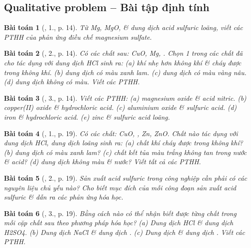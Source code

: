 \documentclass{article}
\newtheorem{baitoan}{Bài toán}
\begin{document}
\subsection{Qualitative problem -- Bài tập định tính}

\begin{baitoan}[\cite{SGK_Hoa_Hoc_9}, 1., p. 14]
	Từ \emph{Mg, MgO, } \& dung dịch acid sulfuric loãng, viết các PTHH của phản ứng điều chế magnesium sulfate.
\end{baitoan}

\begin{baitoan}[\cite{SGK_Hoa_Hoc_9}, 2., p. 14]
	Có các chất sau: \emph{CuO, Mg, }. Chọn 1 trong các chất đã cho tác dụng với dung dịch \emph{HCl} sinh ra: (a) khí nhẹ hơn không khí \& cháy được trong không khí. (b) dung dịch có màu xanh lam. (c) dung dịch có màu vàng nâu. (d) dung dịch không có màu. Viết các PTHH.
\end{baitoan}

\begin{baitoan}[\cite{SGK_Hoa_Hoc_9}, 3., p. 14]
	Viết các PTHH: (a) magnesium oxide \& acid nitric. (b) copper(II) oxide \& hydrochloric acid. (c) aluminium oxide \& sulfuric acid. (d) iron \& hydrochloric acid. (e) zinc \& sulfuric acid loãng.
\end{baitoan}

\begin{baitoan}[\cite{SGK_Hoa_Hoc_9}, 1., p. 19]
	Có các chất: \emph{CuO, , Zn, ZnO}. Chất nào tác dụng với dung dịch \emph{HCl}, dung dịch \emph{} loãng sinh ra: (a) chất khí cháy được trong không khí? (b) dung dịch có màu xanh lam? (c) chất kết tủa màu trắng không tan trong nước \& acid? (d) dung dịch không màu \& nước? Viết tất cả các PTHH.
\end{baitoan}

\begin{baitoan}[\cite{SGK_Hoa_Hoc_9}, 2., p. 19]
	Sản xuất acid sulfuric trong công nghiệp cần phải có các nguyên liệu chủ yếu nào? Cho biết mục đích của mỗi công đoạn sản xuất acid sulfuric \& dẫn ra các phản ứng hóa học.
\end{baitoan}

\begin{baitoan}[\cite{SGK_Hoa_Hoc_9}, 3., p. 19]
	Bằng cách nào có thể nhận biết được từng chất trong mỗi cặp chất sau theo phương pháp hóa học? (a) Dung dịch \emph{HCl} \& dung dịch \emph{H2SO4}. (b) Dung dịch \emph{NaCl} \& dung dịch \emph{}. (c) Dung dịch \emph{} \& dung dịch \emph{}. Viết các PTHH.
\end{baitoan}
\end{document}
